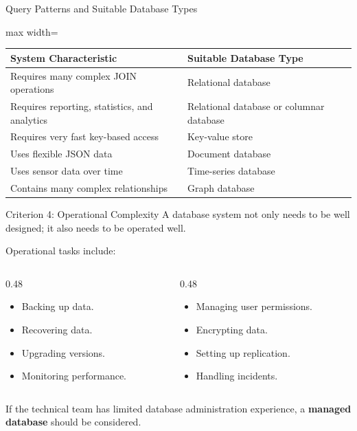 \documentclass[aspectratio=169,11pt]{beamer}
\newcommand{\keyword}[1]{\textcolor{accent}{\textbf{#1}}}
\newcommand{\kw}[1]{\keyword{#1}}
\newcommand{\smallitem}{\setlength{\itemsep}{2pt}\setlength{\parskip}{0pt}}
\begin{document}
\begin{frame}{Query Patterns and Suitable Database Types}
\scriptsize
\begin{adjustbox}{max width=\textwidth}
\begin{tabularx}{\textwidth}{>{\raggedright\arraybackslash}p{}>{\raggedright\arraybackslash}X}
\toprule
\textbf{System Characteristic} & \textbf{Suitable Database Type} \\
\midrule
Requires many complex JOIN operations & Relational database \\
Requires reporting, statistics, and analytics & Relational database or columnar database \\
Requires very fast key-based access & Key-value store \\
Uses flexible JSON data & Document database \\
Uses sensor data over time & Time-series database \\
Contains many complex relationships & Graph database \\
\bottomrule
\end{tabularx}
\end{adjustbox}
\end{frame}

\begin{frame}{Criterion 4: Operational Complexity}
A database system not only needs to be well designed; it also needs to be operated well.

\vspace{2mm}
Operational tasks include:
\begin{columns}[T]
\begin{column}{0.48\textwidth}
\begin{itemize}
  \smallitem
  \item Backing up data.
  \item Recovering data.
  \item Upgrading versions.
  \item Monitoring performance.
\end{itemize}
\end{column}
\begin{column}{0.48\textwidth}
\begin{itemize}
  \smallitem
  \item Managing user permissions.
  \item Encrypting data.
  \item Setting up replication.
  \item Handling incidents.
\end{itemize}
\end{column}
\end{columns}

\vspace{1mm}
If the technical team has limited database administration experience, a \kw{managed database} should be considered.
\end{frame}
\end{document}
